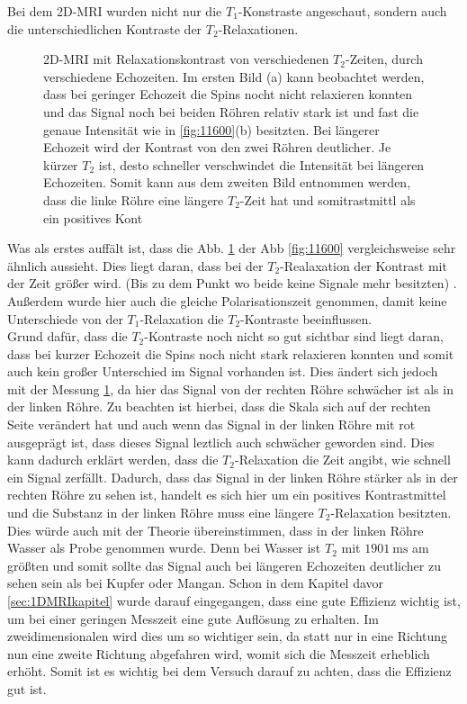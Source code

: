 Bei dem 2D-MRI wurden nicht nur die $T_1$-Konstraste angeschaut, sondern auch die unterschiedlichen Kontraste der $T_2$-Relaxationen. 

    \begin{figure}[H]
        \centering
        {}
        {}
        \caption[2D-MRI mit Relaxationskontrast von verschiedenen $T_2$-Zeiten, durch verschiedene Echozeiten]{2D-MRI mit Relaxationskontrast von verschiedenen $T_2$-Zeiten, durch verschiedene Echozeiten. Im ersten Bild (a) kann beobachtet werden, dass bei geringer Echozeit die Spins nocht nicht relaxieren konnten und das Signal noch bei beiden Röhren relativ stark ist und fast die genaue Intensität wie in \ref{fig:11600}(b) besitzten. Bei längerer Echozeit wird der Kontrast von den zwei Röhren deutlicher. Je kürzer $T_2$ ist, desto schneller verschwindet die Intensität bei längeren Echozeiten. Somit kann aus dem zweiten Bild entnommen werden, dass die linke Röhre eine längere $T_2$-Zeit hat und somitrastmittl als ein positives Kont}\label{fig:1250}
    \end{figure}
Was als erstes auffält ist, dass die Abb. \ref{fig:1250} der Abb \ref{fig:11600}  vergleichsweise sehr ähnlich aussieht. Dies liegt daran, dass bei der $T_2$-Realaxation der Kontrast mit der Zeit größer wird. (Bis zu dem Punkt wo beide keine Signale mehr besitzten) . Außerdem wurde hier auch die gleiche Polarisationszeit genommen, damit keine Unterschiede von der $T_1$-Relaxation die $T_2$-Kontraste beeinflussen. \\
Grund dafür, dass die $T_2$-Kontraste noch nicht so gut sichtbar sind liegt daran, dass bei kurzer Echozeit die Spins noch nicht stark relaxieren konnten und somit auch kein großer Unterschied im Signal vorhanden ist. Dies ändert sich jedoch mit der Messung \ref{fig:1250}, da hier das Signal von der rechten Röhre schwächer ist als in der linken Röhre. Zu beachten ist hierbei, dass die Skala sich auf der rechten Seite verändert hat und auch wenn das Signal in der linken Röhre mit rot ausgeprägt ist, dass dieses Signal leztlich auch schwächer geworden sind. Dies kann dadurch erklärt werden, dass die $T_2$-Relaxation die Zeit angibt, wie schnell ein Signal zerfällt. Dadurch, dass das Signal in der linken Röhre stärker als in der rechten Röhre zu sehen ist, handelt es sich hier um ein positives Kontrastmittel und die Substanz in der linken Röhre muss eine längere $T_2$-Relaxation besitzten.  
Dies würde auch mit der Theorie übereinstimmen, dass in der linken Röhre Wasser als Probe genommen wurde. Denn bei Wasser ist $T_2$ mit  $\SI{1901}{\milli\second}$ am größten und somit sollte das Signal auch bei längeren Echozeiten deutlicher zu sehen sein als bei Kupfer oder Mangan.
Schon in dem Kapitel davor \ref{sec:1DMRIkapitel} wurde darauf eingegangen, dass eine gute Effizienz wichtig ist, um bei einer geringen Messzeit eine gute Auflösung zu erhalten. Im zweidimensionalen wird dies um so wichtiger sein, da statt nur in eine Richtung nun eine zweite Richtung abgefahren wird, womit sich die Messzeit erheblich erhöht. Somit ist es wichtig bei dem Versuch darauf zu achten, dass die Effizienz gut ist.